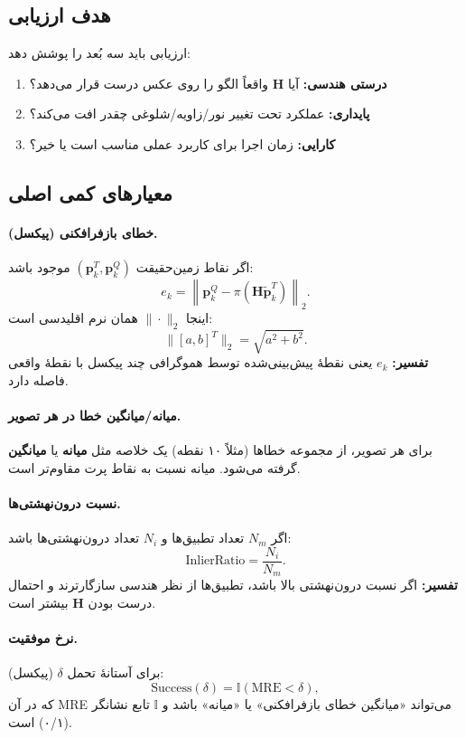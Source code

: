 
\subsection{هدف ارزیابی}
ارزیابی باید سه بُعد را پوشش دهد:
\begin{enumerate}
  \item \textbf{درستی هندسی:} آیا $\mathbf{H}$ واقعاً الگو را روی عکس درست قرار می‌دهد؟
  \item \textbf{پایداری:} عملکرد تحت تغییر نور/زاویه/شلوغی چقدر افت می‌کند؟
  \item \textbf{کارایی:} زمان اجرا برای کاربرد عملی مناسب است یا خیر؟
\end{enumerate}

\subsection{معیارهای کمی اصلی}
\paragraph{خطای بازفرافکنی (پیکسل).}
اگر نقاط زمین‌حقیقت $(\mathbf{p}_k^T,\mathbf{p}_k^Q)$ موجود باشد:
\[
e_k = \left\|\mathbf{p}_k^Q - \pi(\mathbf{H}\tilde{\mathbf{p}}_k^T)\right\|_2.
\]
اینجا $\|\cdot\|_2$ همان نرم اقلیدسی است:
\[
\|[a,b]^T\|_2=\sqrt{a^2+b^2}.
\]
\textbf{تفسیر:} $e_k$ یعنی نقطهٔ پیش‌بینی‌شده توسط هموگرافی چند پیکسل با نقطهٔ واقعی فاصله دارد.

\paragraph{میانه/میانگین خطا در هر تصویر.}
برای هر تصویر، از مجموعه خطاها (مثلاً ۱۰ نقطه) یک خلاصه مثل \textbf{میانه} یا \textbf{میانگین} گرفته می‌شود. میانه نسبت به نقاط پرت مقاوم‌تر است.

\paragraph{نسبت درون‌نهشتی‌ها.}
اگر $N_m$ تعداد تطبیق‌ها و $N_i$ تعداد درون‌نهشتی‌ها باشد:
\[
\text{InlierRatio} = \frac{N_i}{N_m}.
\]
\textbf{تفسیر:} اگر نسبت درون‌نهشتی بالا باشد، تطبیق‌ها از نظر هندسی سازگارترند و احتمال درست بودن $\mathbf{H}$ بیشتر است.

\paragraph{نرخ موفقیت.}
برای آستانهٔ تحمل $\delta$ (پیکسل):
\[
\text{Success}(\delta)=\mathbb{I}(\text{MRE}<\delta),
\]
که در آن MRE می‌تواند «میانگین خطای بازفرافکنی» یا «میانه» باشد و $\mathbb{I}$ تابع نشانگر (۰/۱) است.

